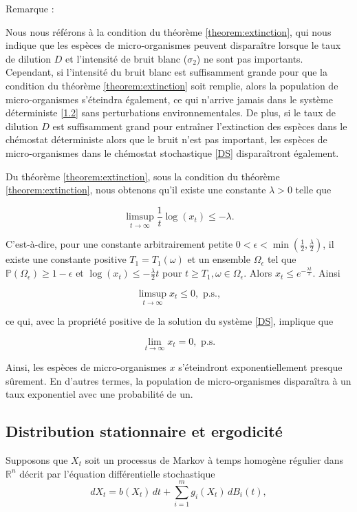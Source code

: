\documentclass[12pt,a4paper]{report}%
\newcounter{remm}[chapter]
\newenvironment{remarque}[2][]
  {\refstepcounter{remm}
  \begin{bclogo}[
    couleur=white,
    arrondi=0.1,
    couleurBord=white,#1]{Remarque \theremm:#2}
  }
  {\end{bclogo}}
\begin{document}
\begin{remarque}{}
	Nous nous référons à la condition du théorème \ref{theorem:extinction}, qui nous indique que les espèces de micro-organismes peuvent disparaître lorsque le taux de dilution \( D \) et l'intensité de bruit blanc ($\sigma_2$) ne sont pas importants. Cependant, si l'intensité du bruit blanc est suffisamment grande pour que la condition du théorème \ref{theorem:extinction}  soit remplie, alors la population de micro-organismes s'éteindra également, ce qui n'arrive jamais dans le système déterministe \eqref{1.2} sans perturbations environnementales. De plus, si le taux de dilution \( D \) est suffisamment grand pour entraîner l'extinction des espèces dans le chémostat déterministe alors que le bruit n'est pas important, les espèces de micro-organismes dans le chémostat stochastique \eqref{DS} disparaîtront également.
	
	Du théorème \ref{theorem:extinction}, sous la condition du théorème \ref{theorem:extinction}, nous obtenons qu'il existe une constante \( \lambda > 0 \) telle que
	
	\[ \limsup_{t \to \infty} \frac{1}{t} \log(x_t) \leq -\lambda. \]
	
	C'est-à-dire, pour une constante arbitrairement petite \( 0 < \epsilon < \min\left(\frac{1}{2}, \frac{\lambda}{2}\right) \), il existe une constante positive \( T_1 = T_1(\omega) \) et un ensemble \( \Omega_\epsilon \) tel que \( \mathbb{P}(\Omega_\epsilon) \geq 1 - \epsilon \) et \( \log(x_t) \leq -\frac{\lambda}{2} t \) pour \( t \geq T_1, \omega \in \Omega_\epsilon \). Alors \( x_t \leq e^{-\frac{\lambda t}{2}} \). Ainsi
	
	\[ \limsup_{t \to \infty}x_t \leq 0, \text{ p.s.}, \]
	
	ce qui, avec la propriété positive de la solution du système \eqref{DS}, implique que
	
	\[ \lim_{t \to \infty} x_t = 0, \text{ p.s.} \]
	
	Ainsi, les espèces de micro-organismes \( x \) s'éteindront exponentiellement presque sûrement. En d'autres termes, la population de micro-organismes disparaîtra à un taux exponentiel avec une probabilité de un.
\end{remarque}
\subsection{Distribution stationnaire et ergodicité}
Supposons que \(X_t\) soit un processus de Markov à temps homogène régulier dans \(\mathbb{R}^n\) décrit par l'équation différentielle stochastique
\begin{equation}\label{pp}
	dX_t = b(X_t) \, dt + \sum_{i=1}^{m} g_i(X_t) \, dB_i(t),
\end{equation}
\end{document}
